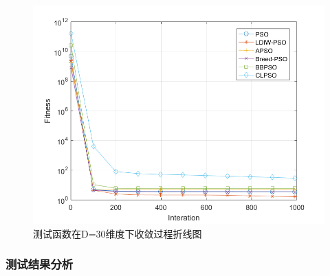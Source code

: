 \begin{figure}[htbp]
{\begin{minipage}[b]{0.32\linewidth}
			\includegraphics[width=1\linewidth]{pic/Schwefel2}\vspace{4pt}
	\end{minipage}}
	\caption{测试函数在D=30维度下收敛过程折线图}
\end{figure}


\subsubsection{测试结果分析}

